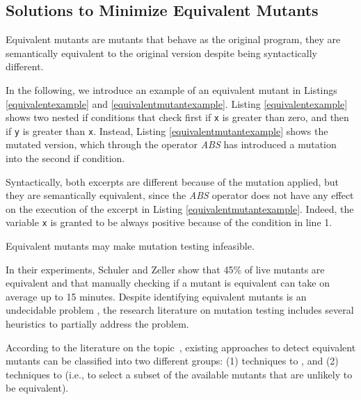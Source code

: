 
\subsection{Solutions to Minimize Equivalent Mutants}
\label{sec:opt:equivalent}

Equivalent mutants are mutants that behave as the original program, they are semantically equivalent to the original version despite being syntactically different. 

In the following, we introduce an example of an equivalent mutant in Listings \ref{equivalentexample} and \ref{equivalentmutantexample}. Listing \ref{equivalentexample} shows two nested if conditions that check first if \texttt{x} is greater than zero, and then if \texttt{y} is greater than \texttt{x}. Instead, Listing \ref{equivalentmutantexample} shows the mutated version, which through the operator \textit{ABS} has introduced a mutation into the second if condition.



Syntactically, both excerpts are different because of the mutation applied, but they are semantically equivalent, since the \textit{ABS} operator does not have any effect on the execution of the excerpt in Listing \ref{equivalentmutantexample}. Indeed, the variable \texttt{x} is granted to be always positive because of the condition in line 1.

Equivalent mutants may make mutation testing infeasible.  

In their experiments, Schuler and Zeller \cite{schuler2013covering} show that 45\% of live mutants are equivalent and that manually checking if a mutant is equivalent can take on average up to 15 minutes. Despite identifying equivalent mutants is an undecidable problem \cite{madeyski2013overcoming}, the research literature on mutation testing includes several heuristics to partially address the problem. 

According to the literature on the topic~\cite{madeyski2013overcoming}, existing approaches to detect equivalent mutants can be classified into two different groups: (1) techniques to , and (2) techniques to  (i.e., to select a subset of the available mutants that are unlikely to be equivalent).

